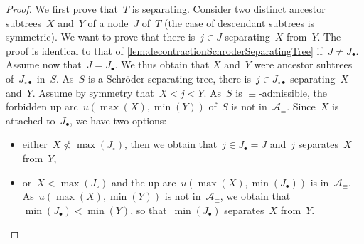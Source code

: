 \documentclass{amsart}
\theoremstyle{definition}
\newcommand{\set}[2]{\left\{ #1 \;\middle|\; #2 \right\}} %
\newcommand{\eqdef}{\mbox{\,\raisebox{0.2ex}{\scriptsize\ensuremath{\mathrm:}}\ensuremath{=}\,}} %
\newcommand{\arcs}{{\mathcal{A}}} %
\begin{document}
\begin{proof}
We first prove that~$T$ is separating. %
Consider two distinct ancestor subtrees~$X$ and~$Y$ of a node~$J$ of~$T$ (the case of descendant subtrees is symmetric).
We want to prove that there is~$j \in J$ separating~$X$ from~$Y$.
The proof is identical to that of \cref{lem:decontractionSchroderSeparatingTree} if~$J \ne J_\bullet$.
Assume now that~$J = J_\bullet$.
We thus obtain that $X$ and~$Y$ were ancestor subtrees of~$J_{\circ\bullet}$ in~$S$.
As~$S$ is a Schröder separating tree, there is~$j \in J_{\circ\bullet}$ separating~$X$ and~$Y$.
Assume by symmetry that~$X < j < Y$.
As~$S$ is $\equiv$-admissible, the forbidden up arc~$u(\max(X), \min(Y))$ of~$S$ is not in~$\arcs_\equiv$.
Since~$X$ is attached to~$J_\bullet$, we have two options:
\begin{itemize}
\item either~$X \not< \max(J_\circ)$, then we obtain that~$j \in J_\bullet = J$ and~$j$ separates~$X$ from~$Y$,
\item or~$X < \max(J_\circ)$ and the up arc~$u(\max(X), \min(J_\bullet))$ is in~$\arcs_\equiv$. As~$u(\max(X), \min(Y))$ is not in~$\arcs_\equiv$, we obtain that~$\min(J_\bullet) < \min(Y)$, so that~$\min(J_\bullet)$ separates~$X$ from~$Y$.
\end{itemize}


\end{proof}
\end{document}
